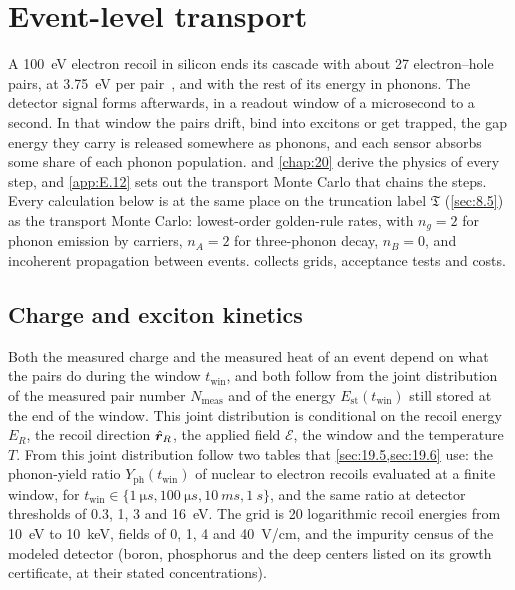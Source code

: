 \section{Event-level transport}\label{app:E.25}

A \SI{100}{eV} electron recoil in silicon ends its cascade with about 27 electron--hole pairs, at \SI{3.75}{eV} per pair~\cite{rodrigues2021absolute}, and with the rest of its energy in phonons. The detector signal forms afterwards, in a readout window of a microsecond to a second. In that window the pairs drift, bind into excitons or get trapped, the gap energy they carry is released somewhere as phonons, and each sensor absorbs some share of each phonon population.  and \cref{chap:20} derive the physics of every step, and \cref{app:E.12} sets out the transport Monte Carlo that chains the steps. Every calculation below is at the same place on the truncation label $\mathfrak{T}$ (\cref{sec:8.5}) as the transport Monte Carlo: lowest-order golden-rule rates, with $n_g = 2$ for phonon emission by carriers, $n_A = 2$ for three-phonon decay, $n_B = 0$, and incoherent propagation between events.  collects grids, acceptance tests and costs.

\subsection{Charge and exciton kinetics}

Both the measured charge and the measured heat of an event depend on what the pairs do during the window $t_{\mathrm{win}}$, and both follow from the joint distribution of the measured pair number $N_{\mathrm{meas}}$ and of the energy $E_{\mathrm{st}}(t_{\mathrm{win}})$ still stored at the end of the window. This joint distribution is conditional on the recoil energy $E_R$, the recoil direction $\hat{\bm{r}}_R$, the applied field $\mathcal{E}$, the window and the temperature $T$. From this joint distribution follow two tables that \cref{sec:19.5,sec:19.6} use: the phonon-yield ratio $Y_{\mathrm{ph}}(t_{\mathrm{win}})$ of nuclear to electron recoils evaluated at a finite window, for $t_{\mathrm{win}} \in \{\SI{1}{\micro s}, \SI{100}{\micro s}, \SI{10}{ms}, \SI{1}{s}\}$, and the same ratio at detector thresholds of 0.3, 1, 3 and \SI{16}{eV}. The grid is 20 logarithmic recoil energies from \SI{10}{eV} to \SI{10}{keV}, fields of 0, 1, 4 and \SI{40}{V/cm}, and the impurity census of the modeled detector (boron, phosphorus and the deep centers listed on its growth certificate, at their stated concentrations).

